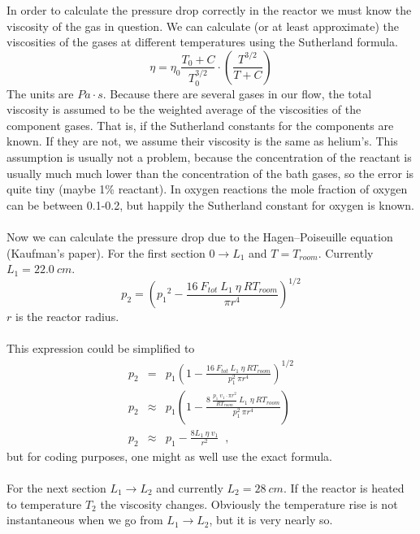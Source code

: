 \documentclass[10pt, a4paper]{article}
\begin{document}
\\
\\
In order to calculate the pressure drop correctly in the reactor we must know the viscosity of the gas in question. We can calculate (or at least approximate) the viscosities of the gases at different temperatures using the Sutherland formula. 
\begin{equation*}
\eta = \eta_0 \frac{T_0 + C}{T_0^{3/2}} \cdot \left( \frac{T^{3/2}}{T + C} \right) 
\end{equation*}
The units are $Pa \cdot s$. Because there are several gases in our flow, the total viscosity is assumed to be the weighted average of the viscosities of the component gases. That is, if the Sutherland constants for the components are known. If they are not, we assume their viscosity is the same as helium's. This assumption is usually not a problem, because the concentration of the reactant is usually much much lower than the concentration of the bath gases, so the error is quite tiny (maybe 1\% reactant). In oxygen reactions the mole fraction of oxygen can be between 0.1-0.2, but happily the Sutherland constant for oxygen is known.
\\
\\
Now we can calculate the pressure drop due to the Hagen–Poiseuille equation (Kaufman's paper). For the first section $0 \rightarrow L_1$ and $T = T_{room}$. Currently $L_1 = 22.0\:cm$. 
\begin{equation*}
p_2 = \left( {p_1}^2 - \frac{16\:F_{tot} \: L_1 \: \eta \: RT_{room}}{\pi r^4} \right)^{1/2}
\end{equation*}
$r$ is the reactor radius. 
\\
\\
This expression could be simplified to 
\begin{eqnarray*}
p_2 &=& p_1\left(  1 - \frac{16\:F_{tot} \: L_1 \: \eta \: R T_{room} }{p_1^2 \: \pi r^4} \right)^{1/2} \\
p_2 &\approx & p_1 \left( 1 - \frac{8\:\frac{p_1\; v_1 \cdot \pi r^2}{R T_{room}  } \: L_1 \; \eta \: RT_{room}}{p_1^2 \: \pi r^4} \right) \\
p_2 &\approx & p_1 - \frac{8L_1 \: \eta \: v_1}{r^2} \;\;,
\end{eqnarray*}
but for coding purposes, one might as well use the exact formula. 
\\
\\
For the next section $L_1 \rightarrow L_2$ and currently $L_2 = 28\:cm$. If the reactor is heated to temperature $T_2$ the viscosity changes. Obviously the temperature rise is not instantaneous when we go from $L_1 \rightarrow L_2$, but it is very nearly so. 
\end{document}
